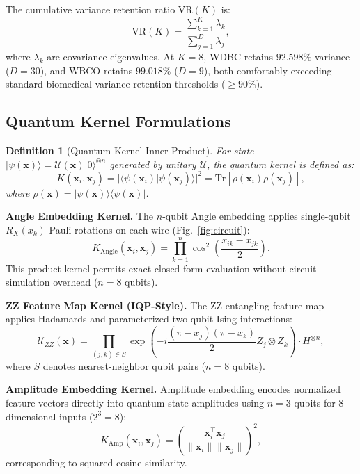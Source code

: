 \documentclass[journal,twocolumn]{IEEEtran}
\newtheorem{definition}{Definition}
\begin{document}
The cumulative variance retention ratio $\text{VR}(K)$ is:
\begin{equation}
    \text{VR}(K) = \frac{\sum_{k=1}^{K} \lambda_k}{\sum_{j=1}^{D} \lambda_j},
    \label{eq:pca_var}
\end{equation}
where $\lambda_k$ are covariance eigenvalues. At $K=8$, WDBC retains $92.598\%$ variance ($D=30$), and WBCO retains $99.018\%$ ($D=9$), both comfortably exceeding standard biomedical variance retention thresholds ($\ge 90\%$).

\subsection{Quantum Kernel Formulations}

\begin{definition}[Quantum Kernel Inner Product]
For state $|\psi(\mathbf{x})\rangle = \mathcal{U}(\mathbf{x})|0\rangle^{\otimes n}$ generated by unitary $\mathcal{U}$, the quantum kernel is defined as:
\begin{equation}
    K(\mathbf{x}_i, \mathbf{x}_j) = |\langle\psi(\mathbf{x}_i)|\psi(\mathbf{x}_j)\rangle|^2 = \text{Tr}[\rho(\mathbf{x}_i)\rho(\mathbf{x}_j)],
    \label{eq:qkernel}
\end{equation}
where $\rho(\mathbf{x}) = |\psi(\mathbf{x})\rangle\langle\psi(\mathbf{x})|$.
\end{definition}

\textbf{Angle Embedding Kernel.} The $n$-qubit Angle embedding applies single-qubit $R_X(x_k)$ Pauli rotations on each wire (Fig.~\ref{fig:circuit}):
\begin{equation}
    K_{\text{Angle}}(\mathbf{x}_i, \mathbf{x}_j) = \prod_{k=1}^{n} \cos^2\!\left(\frac{x_{ik} - x_{jk}}{2}\right).
    \label{eq:angle_kernel}
\end{equation}
This product kernel permits exact closed-form evaluation without circuit simulation overhead ($n=8$ qubits).

\textbf{ZZ Feature Map Kernel (IQP-Style).} The ZZ entangling feature map applies Hadamards and parameterized two-qubit Ising interactions:
\begin{equation}
    \mathcal{U}_{ZZ}(\mathbf{x}) = \prod_{(j,k)\in S} \exp\!\left(-i\frac{(\pi - x_j)(\pi - x_k)}{2} Z_j \otimes Z_k\right) \cdot H^{\otimes n},
    \label{eq:zz_circuit}
\end{equation}
where $S$ denotes nearest-neighbor qubit pairs ($n=8$ qubits).

\textbf{Amplitude Embedding Kernel.} Amplitude embedding encodes normalized feature vectors directly into quantum state amplitudes using $n=3$ qubits for 8-dimensional inputs ($2^3 = 8$):
\begin{equation}
    K_{\text{Amp}}(\mathbf{x}_i, \mathbf{x}_j) = \left(\frac{\mathbf{x}_i^\top \mathbf{x}_j}{\|\mathbf{x}_i\|\|\mathbf{x}_j\|}\right)^2,
    \label{eq:amp_kernel}
\end{equation}
corresponding to squared cosine similarity.
\end{document}
